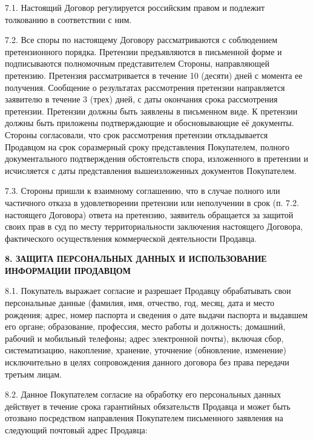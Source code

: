 \documentclass[a4paper,12pt]{article}
\begin{document}
\begin{description}\item7.1. Настоящий Договор регулируется российским правом и подлежит толкованию в соответствии с ним.\end{description}
\begin{description}\item7.2. Все споры по настоящему Договору рассматриваются с соблюдением претензионного порядка. Претензии предъявляются в письменной форме и подписываются полномочным представителем Стороны, направляющей претензию. Претензия рассматривается в течение 10  (десяти) дней с момента ее получения. Сообщение о результатах рассмотрения претензии направляется заявителю в течение 3 (трех) дней, с даты окончания срока рассмотрения претензии. Претензии должны быть заявлены в письменном виде. К претензии должны быть приложены подтверждающие и обосновывающие её документы. Стороны согласовали, что срок рассмотрения претензии откладывается Продавцом на срок соразмерный сроку  представления Покупателем, полного документального подтверждения обстоятельств спора, изложенного в претензии и исчисляется с даты представления вышеизложенных документов Покупателем. \end{description}
\begin{description}\item7.3. Стороны пришли к взаимному соглашению, что в случае полного или частичного отказа в удовлетворении претензии или неполучении в срок (п. 7.2. настоящего Договора) ответа на претензию, заявитель обращается  за защитой своих прав в суд по месту территориальности заключения настоящего Договора, фактического осуществления коммерческой деятельности  Продавца. \end{description}

\begin{center}
 \vspace{1 ex}
 \textbf{8. ЗАЩИТА ПЕРСОНАЛЬНЫХ ДАННЫХ И ИСПОЛЬЗОВАНИЕ
ИНФОРМАЦИИ ПРОДАВЦОМ }
 \vspace{1ex}
    \end{center}

\begin{description}\item8.1. Покупатель выражает согласие и разрешает Продавцу обрабатывать свои персональные данные (фамилия, имя, отчество, год, месяц, дата и место рождения; адрес, номер паспорта и сведения о дате выдачи паспорта и выдавшем его органе; образование, профессия, место работы и должность; домашний, рабочий и мобильный телефоны; адрес электронной почты), включая сбор, систематизацию, накопление, хранение, уточнение (обновление, изменение) исключительно в целях сопровождения данного договора без права передачи третьим лицам. \end{description}
\begin{description}\item8.2. Данное Покупателем согласие на обработку его персональных данных действует в течение срока гарантийных обязательств Продавца и может быть отозвано посредством направления Покупателем письменного заявления на следующий почтовый адрес Продавца: 
\end{description}
\end{document}
